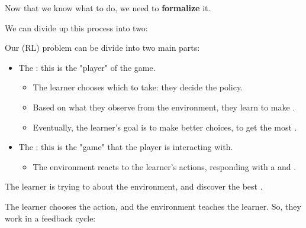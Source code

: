         Now that we know what to do, we need to \textbf{formalize} it.

        We can divide up this process into two:\\

        \begin{definition}
            Our  (RL) problem can be divide into two main parts:

            \begin{itemize}
                \item The : this is the "player" of the game. 
                    \begin{itemize}
                        \item The learner chooses which  to take: they decide the policy.

                        \item Based on what they observe from the environment, they learn to make .

                        \item Eventually, the learner's goal is to make better choices, to get the most .
                    \end{itemize}

                \phantom{}

                \item The : this is the "game" that the player is interacting with.

                    \begin{itemize}
                        \item The environment reacts to the learner's actions, responding with a  and .
                    \end{itemize}
            \end{itemize}

            The learner is trying to  about the environment, and discover the best .
        \end{definition}

        
        The learner chooses the action, and the environment teaches the learner. So, they work in a feedback cycle:

